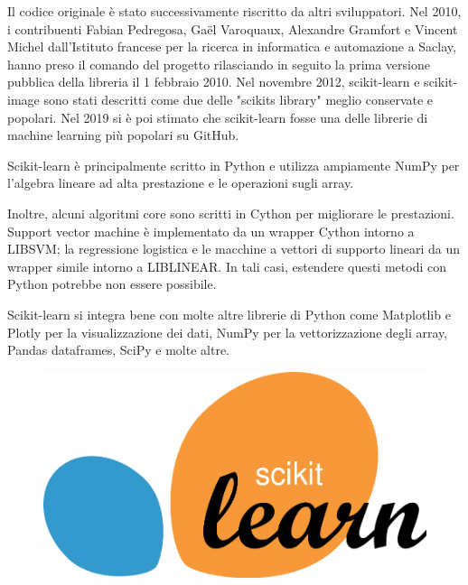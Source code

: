 Il codice originale è stato successivamente riscritto da altri sviluppatori. Nel 2010, i contribuenti Fabian Pedregosa, Gaël Varoquaux, Alexandre Gramfort e Vincent Michel dall'Istituto francese per la ricerca in informatica e automazione a Saclay, hanno preso il comando del progetto rilasciando in  seguito la prima versione pubblica della libreria il 1 febbraio 2010. Nel novembre 2012, scikit-learn e scikit-image sono stati descritti come due delle "scikits library" meglio conservate e popolari. 
Nel 2019 si è poi stimato che scikit-learn fosse una delle librerie di machine learning più popolari su GitHub.

Scikit-learn è principalmente scritto in Python e utilizza ampiamente NumPy per l'algebra lineare ad alta prestazione e le operazioni sugli array. 

Inoltre, alcuni algoritmi core sono scritti in Cython per migliorare le prestazioni. Support vector machine è implementato da un wrapper Cython intorno a LIBSVM; la regressione logistica e le macchine a vettori di supporto lineari da un wrapper simile intorno a LIBLINEAR. In tali casi, estendere questi metodi con Python potrebbe non essere possibile.

Scikit-learn si integra bene con molte altre librerie di Python come Matplotlib e Plotly per la visualizzazione dei dati, NumPy per la vettorizzazione degli array, Pandas dataframes, SciPy e molte altre.

\begin{figure}
    \begin{center}    
        \includegraphics[width=0.7 \linewidth]{images/image9.png}
    \end{center}
\end{figure}

